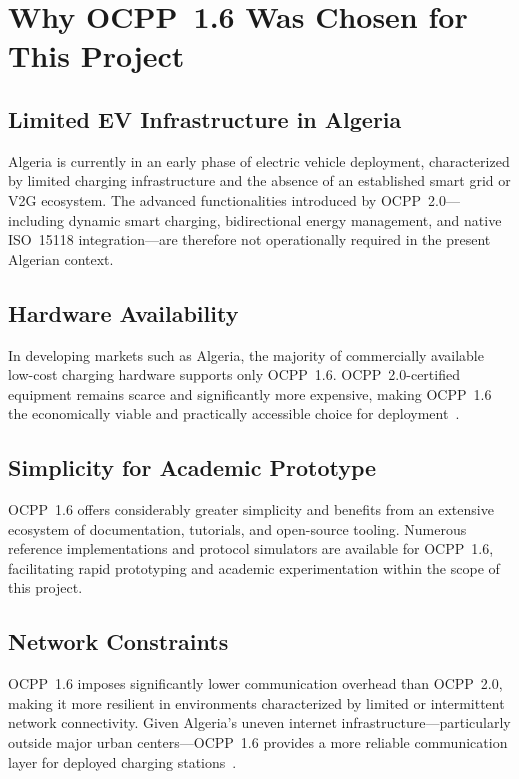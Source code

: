 \documentclass[12pt,a4paper]{report}
\begin{document}
\section{Why OCPP~1.6 Was Chosen for This Project}

\subsection{Limited EV Infrastructure in Algeria}

Algeria is currently in an early phase of electric vehicle deployment, characterized by limited
charging infrastructure and the absence of an established smart grid or V2G ecosystem. The
advanced functionalities introduced by OCPP~2.0---including dynamic smart charging, bidirectional
energy management, and native ISO~15118 integration---are therefore not operationally required
in the present Algerian context.

\subsection{Hardware Availability}

In developing markets such as Algeria, the majority of commercially available low-cost charging
hardware supports only OCPP~1.6. OCPP~2.0-certified equipment remains scarce and significantly
more expensive, making OCPP~1.6 the economically viable and practically accessible choice for
deployment~\autocite{luxman2024}.

\subsection{Simplicity for Academic Prototype}

OCPP~1.6 offers considerably greater simplicity and benefits from an extensive ecosystem of
documentation, tutorials, and open-source tooling. Numerous reference implementations and
protocol simulators are available for OCPP~1.6, facilitating rapid prototyping and academic
experimentation within the scope of this project.

\subsection{Network Constraints}

OCPP~1.6 imposes significantly lower communication overhead than OCPP~2.0, making it more
resilient in environments characterized by limited or intermittent network connectivity. Given
Algeria's uneven internet infrastructure---particularly outside major urban centers---OCPP~1.6
provides a more reliable communication layer for deployed charging stations~\autocite{ampcontrol2024}.
\end{document}
